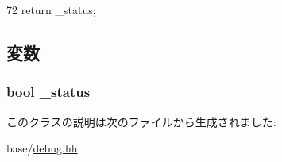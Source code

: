 \begin{DoxyCode}
72 { return _status; }
\end{DoxyCode}


\subsection{変数}
\hypertarget{classDebug_1_1SimpleFlag_ad232e526e83bd3b71faac07c4993487f}{
\subsubsection[{\_\-status}]{\setlength{\rightskip}{0pt plus 5cm}bool {\bf \_\-status}}}
\label{classDebug_1_1SimpleFlag_ad232e526e83bd3b71faac07c4993487f}


このクラスの説明は次のファイルから生成されました:\begin{DoxyCompactItemize}
\item 
base/\hyperlink{base_2debug_8hh}{debug.hh}\end{DoxyCompactItemize}
